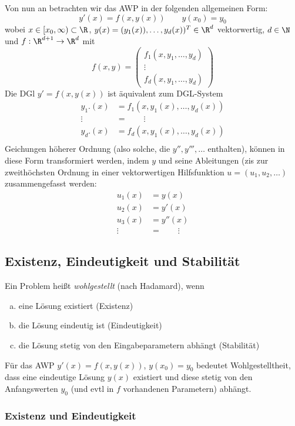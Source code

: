 \documentclass[
]{mycourse}
\begin{document}
Von nun an betrachten wir das AWP in der folgenden allgemeinen Form:
\[
	y'(x) = f(x,y(x))
	\qquad y(x_0) = y_0
\]
wobei $x \in [x_0,\infty) \subset \R$, $y(x) = (y_1(x)),\dotsc,y_d(x))^T \in \R^d$ vektorwertig, $d \in \N$ und $f : \R^{d+1} \to \R^d$ mit
\[
	f(x,y) = \begin{pmatrix}
		f_1(x,y_1,\dotsc, y_d) \\
		\vdots \\
		f_d(x,y_1,\dotsc, y_d)
	\end{pmatrix}
\]
Die DGl $y' = f(x,y(x))$ ist äquivalent zum DGL-System
\begin{align*}
	y_1.(x) &= f_1(x,y_1(x),\dotsc,y_d(x)) \\
	\vdots \quad &= \qquad \vdots \\
	y_d.(x) &= f_d(x,y_1(x),\dotsc,y_d(x)) \\
\end{align*}
Geichungen höherer Ordnung (also solche, die $y'', y''', \dotsc$ enthalten), können in diese Form transformiert werden, indem $y$ und seine Ableitungen (zis zur zweithöchsten Ordnung in einer vektorwertigen Hilfsfunktion $u=(u_1,u_2,\dotsc)$ zusammengefasst werden:
\begin{align*}
	u_1(x) &= y(x) \\
	u_2(x) &= y'(x) \\
	u_3(x) &= y''(x) \\
	\vdots \quad&= \qquad \vdots
\end{align*}


\subsection{Existenz, Eindeutigkeit und Stabilität}


Ein Problem heißt \emph{wohlgestellt} (nach Hadamard), wenn
\begin{enumerate}[a)]
	\item
		eine Lösung existiert (Existenz)
	\item
		die Lösung eindeutig ist (Eindeutigkeit)
	\item
		die Lösung stetig von den Eingabeparametern abhängt (Stabilität)
\end{enumerate}
Für das AWP $y'(x) = f(x,y(x))$, $y(x_0) = y_0$ bedeutet Wohlgestelltheit, dass eine eindeutige Lösung $y(x)$ existiert und diese stetig von den Anfangswerten $y_0$ (und evtl in $f$ vorhandenen Parametern) abhängt.


\subsubsection{Existenz und Eindeutigkeit}
\end{document}
